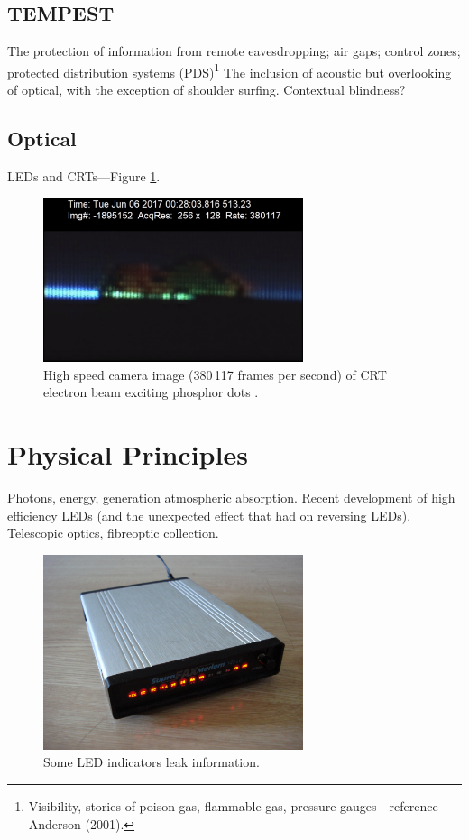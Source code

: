 \documentclass[a4paper,twoside,11pt]{book}
\begin{document}
\subsection{TEMPEST}
The protection of information from remote eavesdropping; air gaps; control
zones; protected distribution systems (PDS)\footnote{Visibility, stories of
poison gas, flammable gas, pressure gauges---reference Anderson (2001).} The
inclusion of acoustic but overlooking of optical, with the exception of
shoulder surfing. Contextual blindness?
\subsection{Optical}
LEDs and CRTs---Figure \ref{figure:slow-mo_guys_crt}.
\begin{figure}[ht]
  \centering
  \includegraphics[width=3in]{slow-mo_guys_crt.png}
  \caption{High speed camera image (380\,117 frames per second) of CRT electron
    beam exciting phosphor dots \protect\cite{Free2018}.}
  \label{figure:slow-mo_guys_crt}
\end{figure}
\section{Physical Principles}
Photons, energy, generation atmospheric absorption. Recent development of
high efficiency LEDs (and the unexpected effect that had on reversing LEDs).
Telescopic optics, fibreoptic collection.
\begin{figure}[ht]
  \centering
  \includegraphics[width=3in]{SupraFAXmodem_144_LC_photo_courtesy_Wikipedia.jpg}
  \caption{Some LED indicators leak information.}
  \label{figure:modem}
\end{figure}
\end{document}
